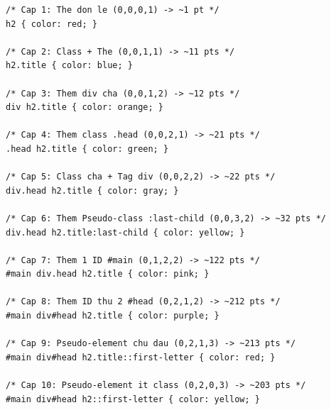 \begin{codeWindow}
\begin{lstlisting}[language=CSS3]
/* Cap 1: The don le (0,0,0,1) -> ~1 pt */
h2 { color: red; }

/* Cap 2: Class + The (0,0,1,1) -> ~11 pts */
h2.title { color: blue; }

/* Cap 3: Them div cha (0,0,1,2) -> ~12 pts */
div h2.title { color: orange; }

/* Cap 4: Them class .head (0,0,2,1) -> ~21 pts */
.head h2.title { color: green; }

/* Cap 5: Class cha + Tag div (0,0,2,2) -> ~22 pts */
div.head h2.title { color: gray; }

/* Cap 6: Them Pseudo-class :last-child (0,0,3,2) -> ~32 pts */
div.head h2.title:last-child { color: yellow; }

/* Cap 7: Them 1 ID #main (0,1,2,2) -> ~122 pts */
#main div.head h2.title { color: pink; }

/* Cap 8: Them ID thu 2 #head (0,2,1,2) -> ~212 pts */
#main div#head h2.title { color: purple; }

/* Cap 9: Pseudo-element chu dau (0,2,1,3) -> ~213 pts */
#main div#head h2.title::first-letter { color: red; }

/* Cap 10: Pseudo-element it class (0,2,0,3) -> ~203 pts */
#main div#head h2::first-letter { color: yellow; }
\end{lstlisting}
\end{codeWindow}

